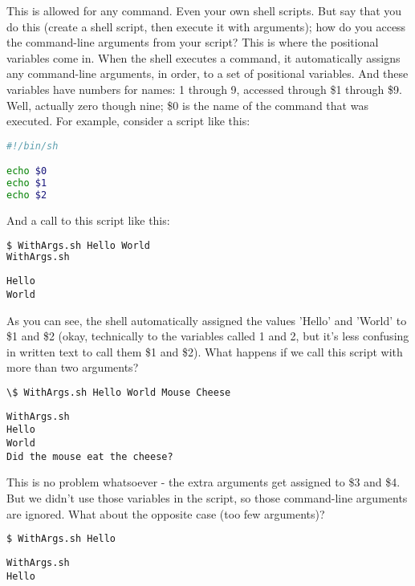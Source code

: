 This is allowed for any command. Even your own shell scripts. But say that you
do this (create a shell script, then execute it with arguments); how do you
access the command-line arguments from your script? This is where the
positional variables come in. When the shell executes a command, it
automatically assigns any command-line arguments, in order, to a set of
positional variables. And these variables have numbers for names: 1 through 9,
accessed through \$1 through \$9. Well, actually zero though nine; \$0 is the
name of the command that was executed. For example, consider a script like
this:
\lstset{basicstyle=\scriptsize, numbers=left, captionpos=b, tabsize=4}
\begin{lstlisting}[caption=WithArgs.sh: A script that uses command-line arguments,language={bash},
xleftmargin=15pt,label=lst:WithArgs.sh:Ascriptthatusescommand-linearguments]
#!/bin/sh

echo $0
echo $1
echo $2
\end{lstlisting}

And a call to this script like this:
\lstset{basicstyle=\scriptsize, numbers=left, captionpos=b, tabsize=4}
\begin{lstlisting}[caption=Calling the script,language={bash},
xleftmargin=15pt,label=lst:Callingthescript]
$ WithArgs.sh Hello World
WithArgs.sh
\end{lstlisting}
\scriptsize
\begin{verbatim}
Hello
World
\end{verbatim}
\normalsize

As you can see, the shell automatically assigned the values 'Hello' and 'World'
to \$1 and \$2 (okay, technically to the variables called 1 and 2, but it's
less confusing in written text to call them \$1 and \$2). What happens if we
call this script with more than two arguments?
\lstset{basicstyle=\scriptsize, numbers=left, captionpos=b, tabsize=4}
\begin{lstlisting}[caption=Calling the script with more arguments,language={bash},
xleftmargin=15pt, label=lst:Calling the script with more arguments]
\$ WithArgs.sh Hello World Mouse Cheese
\end{lstlisting}
\scriptsize
\begin{verbatim}
WithArgs.sh
Hello
World
Did the mouse eat the cheese?
\end{verbatim}
\normalsize

This is no problem whatsoever - the extra arguments get assigned to \$3 and
\$4. But we didn't use those variables in the script, so those command-line
arguments are ignored. What about the opposite case (too few arguments)?
\lstset{basicstyle=\scriptsize, numbers=left, captionpos=b, tabsize=4}
\begin{lstlisting}[caption=Calling the script with too few arguments...,language={bash},
xleftmargin=15pt,label=lst:Callingthescriptwithtoofewarguments...]
$ WithArgs.sh Hello
\end{lstlisting}
\scriptsize
\begin{verbatim}
WithArgs.sh
Hello
\end{verbatim}
\normalsize

